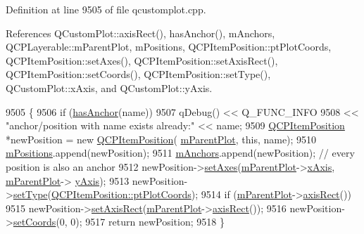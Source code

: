 Definition at line 9505 of file qcustomplot.\+cpp.



References Q\+Custom\+Plot\+::axis\+Rect(), has\+Anchor(), m\+Anchors, Q\+C\+P\+Layerable\+::m\+Parent\+Plot, m\+Positions, Q\+C\+P\+Item\+Position\+::pt\+Plot\+Coords, Q\+C\+P\+Item\+Position\+::set\+Axes(), Q\+C\+P\+Item\+Position\+::set\+Axis\+Rect(), Q\+C\+P\+Item\+Position\+::set\+Coords(), Q\+C\+P\+Item\+Position\+::set\+Type(), Q\+Custom\+Plot\+::x\+Axis, and Q\+Custom\+Plot\+::y\+Axis.


\begin{DoxyCode}
9505                                                                     \{
9506   \textcolor{keywordflow}{if} (\hyperlink{class_q_c_p_abstract_item_acbce9e5ba5252541d19db0c40303357a}{hasAnchor}(name))
9507     qDebug() << Q\_FUNC\_INFO
9508              << \textcolor{stringliteral}{"anchor/position with name exists already:"} << name;
9509   \hyperlink{class_q_c_p_item_position}{QCPItemPosition} *newPosition = \textcolor{keyword}{new} \hyperlink{class_q_c_p_item_position}{QCPItemPosition}(
      \hyperlink{class_q_c_p_layerable_aa2a528433e44db02b8aef23c1f9f90ed}{mParentPlot}, \textcolor{keyword}{this}, name);
9510   \hyperlink{class_q_c_p_abstract_item_a96cab718644f27490f9d967c49fcd18c}{mPositions}.append(newPosition);
9511   \hyperlink{class_q_c_p_abstract_item_a0e1e082dc04ef832411a23905d83cc02}{mAnchors}.append(newPosition); \textcolor{comment}{// every position is also an anchor}
9512   newPosition->\hyperlink{class_q_c_p_item_position_a2185f45c75ac8cb9be89daeaaad50e37}{setAxes}(\hyperlink{class_q_c_p_layerable_aa2a528433e44db02b8aef23c1f9f90ed}{mParentPlot}->\hyperlink{class_q_custom_plot_a9a79cd0158a4c7f30cbc702f0fd800e4}{xAxis}, \hyperlink{class_q_c_p_layerable_aa2a528433e44db02b8aef23c1f9f90ed}{mParentPlot}->
      \hyperlink{class_q_custom_plot_af6fea5679725b152c14facd920b19367}{yAxis});
9513   newPosition->\hyperlink{class_q_c_p_item_position_aa476abf71ed8fa4c537457ebb1a754ad}{setType}(\hyperlink{class_q_c_p_item_position_aad9936c22bf43e3d358552f6e86dbdc8ad5ffb8dc99ad73263f7010c77342294c}{QCPItemPosition::ptPlotCoords});
9514   \textcolor{keywordflow}{if} (\hyperlink{class_q_c_p_layerable_aa2a528433e44db02b8aef23c1f9f90ed}{mParentPlot}->\hyperlink{class_q_custom_plot_a4a37a1add5fe63060ac518cf0a4c4050}{axisRect}())
9515     newPosition->\hyperlink{class_q_c_p_item_position_a0cd9b326fb324710169e92e8ca0041c2}{setAxisRect}(\hyperlink{class_q_c_p_layerable_aa2a528433e44db02b8aef23c1f9f90ed}{mParentPlot}->\hyperlink{class_q_custom_plot_a4a37a1add5fe63060ac518cf0a4c4050}{axisRect}());
9516   newPosition->\hyperlink{class_q_c_p_item_position_aa988ba4e87ab684c9021017dcaba945f}{setCoords}(0, 0);
9517   \textcolor{keywordflow}{return} newPosition;
9518 \}
\end{DoxyCode}


